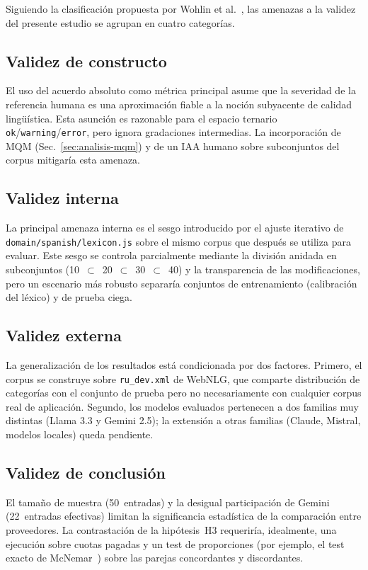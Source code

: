 Siguiendo la clasificación propuesta por Wohlin et al.~\cite{Wohlin2012}, las
amenazas a la validez del presente estudio se agrupan en cuatro categorías.

\subsection{Validez de constructo}
El uso del acuerdo absoluto como métrica principal asume que la severidad de la
referencia humana es una aproximación fiable a la noción subyacente de calidad
lingüística. Esta asunción es razonable para el espacio ternario
\texttt{ok}/\texttt{warning}/\texttt{error}, pero ignora gradaciones
intermedias. La incorporación de MQM (Sec.~\ref{sec:analisis-mqm}) y de un IAA
humano sobre subconjuntos del corpus mitigaría esta amenaza.

\subsection{Validez interna}
La principal amenaza interna es el sesgo introducido por el ajuste iterativo de
\texttt{domain/spanish/lexicon.js} sobre el mismo corpus que después se utiliza
para evaluar. Este sesgo se controla parcialmente mediante la división anidada
en subconjuntos (10~$\subset$~20~$\subset$~30~$\subset$~40) y la transparencia
de las modificaciones, pero un escenario más robusto separaría conjuntos de
entrenamiento (calibración del léxico) y de prueba ciega.

\subsection{Validez externa}
La generalización de los resultados está condicionada por dos factores.
Primero, el corpus se construye sobre \texttt{ru\_dev.xml} de WebNLG, que
comparte distribución de categorías con el conjunto de prueba pero no
necesariamente con cualquier corpus real de aplicación. Segundo, los modelos
evaluados pertenecen a dos familias muy distintas (Llama 3.3 y Gemini 2.5); la
extensión a otras familias (Claude, Mistral, modelos locales) queda pendiente.

\subsection{Validez de conclusión}
El tamaño de muestra (50~entradas) y la desigual participación de Gemini
(22~entradas efectivas) limitan la significancia estadística de la comparación
entre proveedores. La contrastación de la hipótesis~H3 requeriría, idealmente,
una ejecución sobre cuotas pagadas y un test de proporciones (por ejemplo, el
test exacto de McNemar~\cite{McNemar1947}) sobre las parejas concordantes y
discordantes.

